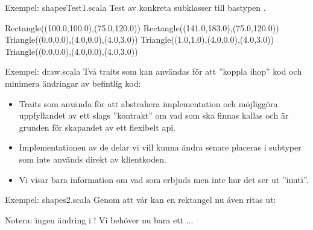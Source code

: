 \begin{Slide}{Exempel: shapesTest1.scala}
Test av konkreta subklasser till bastypen .

\begin{REPL}
Rectangle((100.0,100.0),(75.0,120.0))
Rectangle((141.0,183.0),(75.0,120.0))
Triangle((0.0,0.0),(4.0,0.0),(4.0,3.0))
Triangle((1.0,1.0),(4.0,0.0),(4.0,3.0))
Triangle((0.0,0.0),(4.0,0.0),(4.0,3.0))
\end{REPL}
\end{Slide}


\begin{Slide}{Exempel: draw.scala}
Två traits som kan användas för att ''koppla ihop'' kod och minimera ändringar av befintlig kod:

\pause
\setlength{\leftmargini}{0pt}
\begin{itemize}\SlideFontSmall
\item  Traits som använda för att abstrahera implementation och möjliggöra uppfyllandet av ett slags ''kontrakt'' om vad som ska finnas kallas   och är grunden för skapandet av ett flexibelt api.

\item Implementationen av de delar vi vill kunna ändra senare placeras i subtyper som inte används direkt av klientkoden.

\item Vi visar bara information om vad som erbjuds men inte hur det ser ut ''inuti''.

\end{itemize}
\end{Slide}

\begin{Slide}{Exempel: shapes2.scala}\SlideFontTiny
Genom att  vår  kan en rektangel nu även ritas ut:


\pause
\vspace{-0.5em}Notera: ingen ändring i ! Vi behöver nu bara ett ...
\end{Slide}


